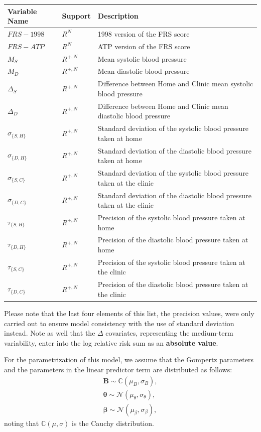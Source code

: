 \documentclass[
]{article}
\begin{document}
\begin{tabular}{lll}
\toprule
Variable Name & Support & Description\\
\midrule
$FRS-1998$ & $R^N$ & 1998 version of the FRS score\\
$FRS-ATP$ & $R^N$ & ATP version of the FRS score\\
$M_S$ & $R^{+,N}$ & Mean systolic blood pressure\\
$M_D$ & $R^{+,N}$ & Mean diastolic blood pressure\\
$\Delta_S$ & $R^{+,N}$ & Difference between Home and Clinic mean systolic blood pressure\\
\addlinespace
$\Delta_D$ & $R^{+,N}$ & Difference between Home and Clinic mean diastolic blood pressure\\
$\sigma_{\{S,H\}}$ & $R^{+,N}$ & Standard deviation of the systolic blood pressure taken at home\\
$\sigma_{\{D,H\}}$ & $R^{+,N}$ & Standard deviation of the diastolic blood pressure taken at home\\
$\sigma_{\{S,C\}}$ & $R^{+,N}$ & Standard deviation of the systolic blood pressure taken at the clinic\\
$\sigma_{\{D,C\}}$ & $R^{+,N}$ & Standard deviation of the diastolic blood pressure taken at the clinic\\
\addlinespace
$\tau_{\{S,H\}}$ & $R^{+,N}$ & Precision of the systolic blood pressure taken at home\\
$\tau_{\{D,H\}}$ & $R^{+,N}$ & Precision of the diastolic blood pressure taken at home\\
$\tau_{\{S,C\}}$ & $R^{+,N}$ & Precision of the systolic blood pressure taken at the clinic\\
$\tau_{\{D,C\}}$ & $R^{+,N}$ & Precision of the diastolic blood pressure taken at the clinic\\
\bottomrule
\end{tabular}

Please note that the last four elements of this list, the precision values, were only carried out to ensure model consistency with the use of standard deviation instead.
Note as well that the \(\Delta\) covariates, representing the medium-term variability, enter into the log relative risk sum as an \textbf{absolute value}.

For the parametrization of this model, we assume that the Gompertz parameters and the parameters in the linear predictor term are distributed as follows:
\begin{equation}\label{priorsS}
\begin{aligned}
  \boldsymbol{B}\sim\mathbb{C}(\mu_B,\sigma_B),\\
  \boldsymbol{\theta}\sim\mathcal{N}(\mu_\theta,\sigma_\theta),\\
  \boldsymbol{\beta}\sim \mathcal{N}(\mu_\beta,\sigma_\beta),
\end{aligned}
\end{equation}
noting that \(\mathbb{C}(\mu,\sigma)\) is the Cauchy distribution.
\end{document}

